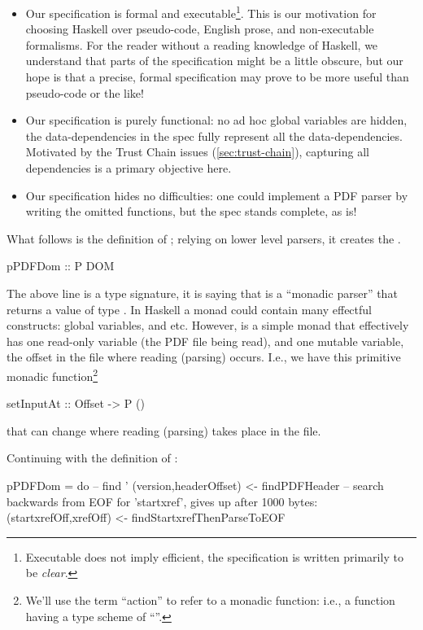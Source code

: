 \begin{itemize}
\item Our specification is formal and executable\footnote{
  Executable does not imply efficient, the specification is written
  primarily to be \emph{clear}.}.
  This is our motivation for choosing Haskell over pseudo-code, English prose,
  and non-executable formalisms.  For the reader without a reading knowledge of
  Haskell, we understand that parts of the specification might be a little
  obscure, but our hope is that a precise, formal specification may prove to be
  more useful than pseudo-code or the like!
  
\item Our specification is purely functional: no ad hoc global variables are
  hidden, the data-dependencies in the spec fully represent all the
  data-dependencies.  Motivated by the Trust Chain issues
  (\cref{sec:trust-chain}), capturing all dependencies is a primary objective
  here.
  
\item Our specification hides no difficulties: one could implement a PDF parser
  by writing the omitted functions, but the spec stands complete, as is!
\end{itemize}


What follows is the definition of ; relying on lower level
parsers, it creates the .
\begin{code}
pPDFDom :: P DOM
\end{code}
The above line is a type signature, it is saying that
 is a ``monadic parser''  that returns a
value of type .
In Haskell a monad could contain many effectful constructs: global variables,
and etc. However,  is a simple monad that effectively has one
read-only variable (the PDF file being read), and one mutable variable,
the offset in the file where reading (parsing) occurs.  I.e., we have
this primitive monadic function\footnote{
  We'll use the term ``action'' to refer to a monadic function:
  i.e., a function having a type scheme of ``''.
}
\begin{codeNoExecute}
setInputAt :: Offset -> P ()
\end{codeNoExecute}
that can change where reading (parsing) takes place in the file.

Continuing with the definition of :
\begin{code}
pPDFDom =
    do
    -- find '%
    (version,headerOffset) <- findPDFHeader
    -- search backwards from EOF for 'startxref', gives up after 1000 bytes:
    (startxrefOff,xrefOff) <- findStartxrefThenParseToEOF
\end{code}

